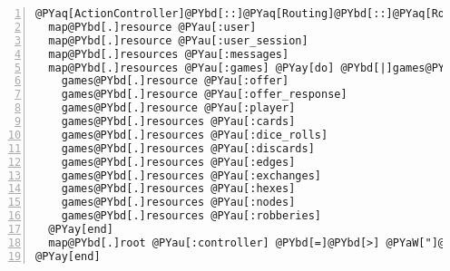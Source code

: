 \begin{Verbatim}[commandchars=@\[\],numbers=left,firstnumber=1,stepnumber=1]
@PYaq[ActionController]@PYbd[::]@PYaq[Routing]@PYbd[::]@PYaq[Routes]@PYbd[.]draw @PYay[do] @PYbd[|]map@PYbd[|]
  map@PYbd[.]resource @PYau[:user]
  map@PYbd[.]resource @PYau[:user_session]
  map@PYbd[.]resources @PYau[:messages]
  map@PYbd[.]resources @PYau[:games] @PYay[do] @PYbd[|]games@PYbd[|]
    games@PYbd[.]resource @PYau[:offer]
    games@PYbd[.]resource @PYau[:offer_response]
    games@PYbd[.]resource @PYau[:player]
    games@PYbd[.]resources @PYau[:cards]
    games@PYbd[.]resources @PYau[:dice_rolls]
    games@PYbd[.]resources @PYau[:discards]
    games@PYbd[.]resources @PYau[:edges]
    games@PYbd[.]resources @PYau[:exchanges]
    games@PYbd[.]resources @PYau[:hexes]
    games@PYbd[.]resources @PYau[:nodes]
    games@PYbd[.]resources @PYau[:robberies]
  @PYay[end]
  map@PYbd[.]root @PYau[:controller] @PYbd[=]@PYbd[>] @PYaW["]@PYaW[games]@PYaW["], @PYau[:action] @PYbd[=]@PYbd[>] @PYaW["]@PYaW[index]@PYaW["]
@PYay[end]
\end{Verbatim}
